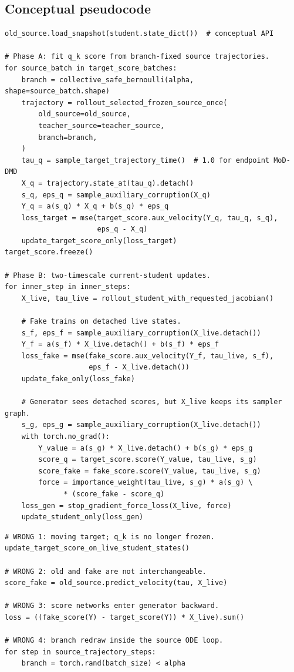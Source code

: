 \documentclass[11pt,a4paper]{article}
\theoremstyle{plain}
\theoremstyle{definition}
\begin{document}
\subsection{Conceptual pseudocode}

\begin{lstlisting}[style=goodpython,caption={Proposed outer/inner structure; names are conceptual, not accepted config/API fields.}]
old_source.load_snapshot(student.state_dict())  # conceptual API

# Phase A: fit q_k score from branch-fixed source trajectories.
for source_batch in target_score_batches:
    branch = collective_safe_bernoulli(alpha, shape=source_batch.shape)
    trajectory = rollout_selected_frozen_source_once(
        old_source=old_source,
        teacher_source=teacher_source,
        branch=branch,
    )
    tau_q = sample_target_trajectory_time()  # 1.0 for endpoint MoD-DMD
    X_q = trajectory.state_at(tau_q).detach()
    s_q, eps_q = sample_auxiliary_corruption(X_q)
    Y_q = a(s_q) * X_q + b(s_q) * eps_q
    loss_target = mse(target_score.aux_velocity(Y_q, tau_q, s_q),
                      eps_q - X_q)
    update_target_score_only(loss_target)
target_score.freeze()

# Phase B: two-timescale current-student updates.
for inner_step in inner_steps:
    X_live, tau_live = rollout_student_with_requested_jacobian()

    # Fake trains on detached live states.
    s_f, eps_f = sample_auxiliary_corruption(X_live.detach())
    Y_f = a(s_f) * X_live.detach() + b(s_f) * eps_f
    loss_fake = mse(fake_score.aux_velocity(Y_f, tau_live, s_f),
                    eps_f - X_live.detach())
    update_fake_only(loss_fake)

    # Generator sees detached scores, but X_live keeps its sampler graph.
    s_g, eps_g = sample_auxiliary_corruption(X_live.detach())
    with torch.no_grad():
        Y_value = a(s_g) * X_live.detach() + b(s_g) * eps_g
        score_q = target_score.score(Y_value, tau_live, s_g)
        score_fake = fake_score.score(Y_value, tau_live, s_g)
        force = importance_weight(tau_live, s_g) * a(s_g) \
              * (score_fake - score_q)
    loss_gen = stop_gradient_force_loss(X_live, force)
    update_student_only(loss_gen)
\end{lstlisting}

\begin{lstlisting}[style=badpython,caption={Wrong detach and role combinations.}]
# WRONG 1: moving target; q_k is no longer frozen.
update_target_score_on_live_student_states()

# WRONG 2: old and fake are not interchangeable.
score_fake = old_source.predict_velocity(tau, X_live)

# WRONG 3: score networks enter generator backward.
loss = ((fake_score(Y) - target_score(Y)) * X_live).sum()

# WRONG 4: branch redraw inside the source ODE loop.
for step in source_trajectory_steps:
    branch = torch.rand(batch_size) < alpha
\end{lstlisting}
\end{document}
